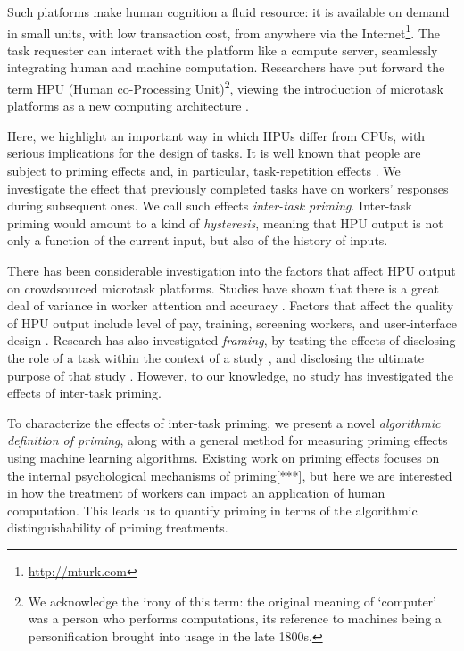 \documentclass[a4paper]{report}
\begin{document}
Such platforms make human cognition a fluid resource: it is available 
on demand in small units, with low transaction 
cost, from anywhere via the 
Internet\footnote{\href{http://mturk.com}{http://mturk.com}}.
The task requester can 
interact with the platform like a compute server, seamlessly 
integrating human and machine computation.  Researchers have put forward the 
term HPU (Human co-Processing Unit)\footnote{We acknowledge the irony of this 
term: the original meaning of `computer' was a person who performs 
computations, its reference to machines being a personification brought into 
usage in the late 1800s\cite{Dictionary:hl}.}, viewing the introduction of 
microtask platforms as a new computing architecture
\cite{5543192}.  

Here, we highlight an important way in which HPUs differ from CPUs, with 
serious implications for the design of tasks.  It is well known that people 
are subject to priming effects 
\cite{BJOP:BJOP1796, No2007, beller1971priming} and, in particular, task-repetition effects
\cite{Gass1999549, sohn2001task}.  
We investigate the effect that previously completed tasks have on workers'
responses during subsequent ones. We call such effects 
\textit{inter-task priming}.  Inter-task priming would amount to a kind of
\textit{hysteresis}, meaning that HPU output is not only a function of the 
current input, but also of the history of inputs.

There has been considerable investigation into the factors that affect HPU 
output on crowdsourced microtask platforms.  Studies have shown that 
there is a great deal of variance in worker attention and 
accuracy \cite{kazai2013analysis}.  Factors that affect the quality of HPU 
output include level of pay\cite{kazai2013analysis}, 
training\cite{le2010ensuring}, screening workers\cite{paolacci2010running}, 
and user-interface design
\cite{Finnerty2013}.  Research has also investigated \textit{framing}, 
by testing the effects of disclosing the role of a task within the 
context of a study \cite{Kinnaird2012281}, and disclosing the ultimate 
purpose of that study \cite{chandler2013breaking}.  However, to our knowledge, 
no study has investigated the effects of inter-task priming.

To characterize the effects of inter-task priming, we present a novel  
\textit{algorithmic definition of priming}, along with a general method 
for measuring priming effects using machine learning algorithms.  
Existing work on priming effects focuses on the internal psychological 
mechanisms of priming[***], but here we are interested in how the treatment of 
workers can impact an application of human computation. This leads us to 
quantify priming in terms of the algorithmic distinguishability of priming
treatments.
\end{document}
